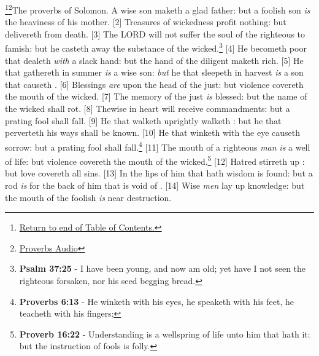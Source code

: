\footnote{\textcolor[cmyk]{0.99998,1,0,0}{\hyperlink{TOC}{Return to end of Table of Contents.}}}\footnote{\href{https://audiobible.com/bible/proverbs_10.html}{\textcolor[cmyk]{0.99998,1,0,0}{Proverbs Audio}}}\textcolor[cmyk]{0.99998,1,0,0}{The proverbs of Solomon. A wise son maketh a glad father: but a foolish son \emph{is} the heaviness of his mother.}
[2] \textcolor[cmyk]{0.99998,1,0,0}{Treasures of wickedness profit nothing: but  delivereth from death.}
[3] \textcolor[cmyk]{0.99998,1,0,0}{The LORD will not suffer the soul of the righteous to famish: but he casteth away the substance of the wicked.}\footnote{\textbf{Psalm 37:25} - I have been young, and now am old; yet have I not seen the righteous forsaken, nor his seed begging bread.}
[4] \textcolor[cmyk]{0.99998,1,0,0}{He becometh poor that dealeth \emph{with} a slack hand: but the hand of the diligent maketh rich.}
[5] \textcolor[cmyk]{0.99998,1,0,0}{He that gathereth in summer \emph{is} a wise son: \emph{but} he that sleepeth in harvest \emph{is} a son that causeth .}
[6] \textcolor[cmyk]{0.99998,1,0,0}{Blessings \emph{are} upon the head of the just: but violence covereth the mouth of the wicked.}
[7] \textcolor[cmyk]{0.99998,1,0,0}{The memory of the just \emph{is} blessed: but the name of the wicked shall rot.}
[8] \textcolor[cmyk]{0.99998,1,0,0}{Thewise in heart will receive commandments: but a prating fool shall fall.}
[9] \textcolor[cmyk]{0.99998,1,0,0}{He that walketh uprightly walketh : but he that perverteth his ways shall be known.}
[10] \textcolor[cmyk]{0.99998,1,0,0}{He that winketh with the eye causeth sorrow: but a prating fool shall fall.}\footnote{\textbf{Proverbs 6:13} - He winketh with his eyes, he speaketh with his feet, he teacheth with his fingers;} 
[11] \textcolor[cmyk]{0.99998,1,0,0}{The mouth of a righteous \emph{man} \emph{is} a well of life: but violence covereth the mouth of the wicked.}\footnote{\textbf{Proverb 16:22} - Understanding is a wellspring of life unto him that hath it: but the instruction of fools is folly.}
[12] \textcolor[cmyk]{0.99998,1,0,0}{Hatred stirreth up : but love covereth all sins.}
[13] \textcolor[cmyk]{0.99998,1,0,0}{In  the lips of him that hath  wisdom is found: but a rod \emph{is} for the back of him that is void of .}
[14] \textcolor[cmyk]{0.99998,1,0,0}{Wise  \emph{men} lay up knowledge: but the mouth of the foolish \emph{is} near destruction.}
